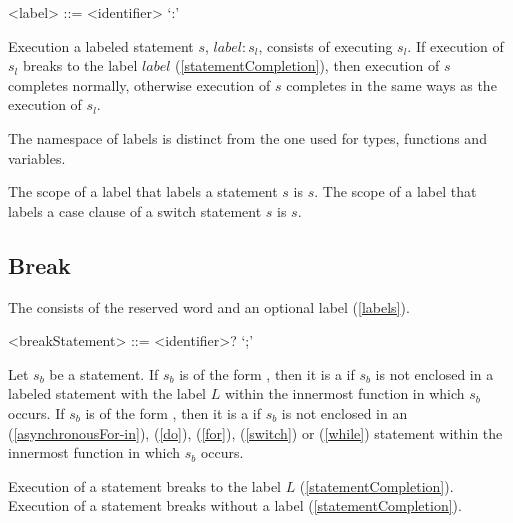 \documentclass[makeidx]{article}
\begin{document}

\begin{grammar}
<label> ::= <identifier> `:'
\end{grammar}

\LMHash{}%
Execution a labeled statement $s$, $label: s_l$, consists of executing $s_l$.
If execution of $s_l$ breaks to the label $label$ (\ref{statementCompletion}),
then execution of $s$ completes normally,
otherwise execution of $s$ completes in the same ways as the execution of $s_l$.

\LMHash{}%
The namespace of labels is distinct from the one used for
types, functions and variables.

\LMHash{}%
The scope of a label that labels a statement $s$ is $s$.
The scope of a label that labels a case clause of a switch statement $s$ is $s$.



\subsection{Break}

\LMHash{}%
The  consists of
the reserved word \BREAK{} and an optional label (\ref{labels}).

\begin{grammar}
<breakStatement> ::= \BREAK{} <identifier>? `;'
\end{grammar}

\LMHash{}%
Let $s_b$ be a \BREAK{} statement.
If $s_b$ is of the form ,
then it is a
 if $s_b$ is not enclosed in a labeled statement
with the label $L$ within the innermost function in which $s_b$ occurs.
If $s_b$ is of the form \code{\BREAK;},
then it is a  if $s_b$ is not enclosed in an
\code{\AWAIT{} \FOR} (\ref{asynchronousFor-in}),
\DO{} (\ref{do}), \FOR{} (\ref{for}), \SWITCH{} (\ref{switch})
or \WHILE{} (\ref{while}) statement within
the innermost function in which $s_b$ occurs.

\LMHash{}%
Execution of a \BREAK{} statement  breaks to the label $L$
(\ref{statementCompletion}).
Execution of a \BREAK{} statement \code{\BREAK;} breaks without a label
(\ref{statementCompletion}).
\end{document}
